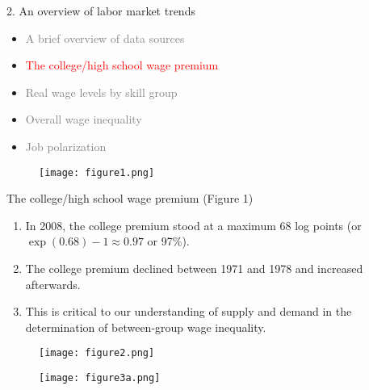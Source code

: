 \documentclass[notes=show]{beamer}
\begin{document}
\begin{frame}{2. An overview of labor market trends}
\begin{itemize}
\item[\textcolor{gray}{2.1}] \textcolor{gray}{A brief overview of data sources} \medskip
\item[\textcolor{red}{2.2}] \textcolor{red}{The college/high school wage premium} \medskip
\item[\textcolor{gray}{2.3}] \textcolor{gray}{Real wage levels by skill group} \medskip
\item[\textcolor{gray}{2.4}] \textcolor{gray}{Overall wage inequality} \medskip
\item [\textcolor{gray}{2.5}] \textcolor{gray}{Job polarization}
\end{itemize}
\end{frame}

\newpage
\begin{center}
\begin{figure}
\texttt{[image: figure1.png]}
\end{figure} 
\end{center}
\newpage

\begin{frame}{The college/high school wage premium (Figure 1)}
\begin{enumerate}
\item In 2008, the college premium stood at a maximum 68 log points (or $\exp(0.68) - 1 \approx 0.97$ or 97\%). \bigskip
\item The college premium declined between 1971 and 1978 and increased afterwards. \bigskip
\item This is critical to our understanding of supply and demand in the determination of between-group wage inequality.
\end{enumerate}
\end{frame}

\newpage
\begin{center}
\begin{figure}
\texttt{[image: figure2.png]}
\end{figure} 
\end{center}
\newpage

\newpage
\begin{center}
\begin{figure}
\texttt{[image: figure3a.png]}
\end{figure} 
\end{center}
\newpage
\end{document}
